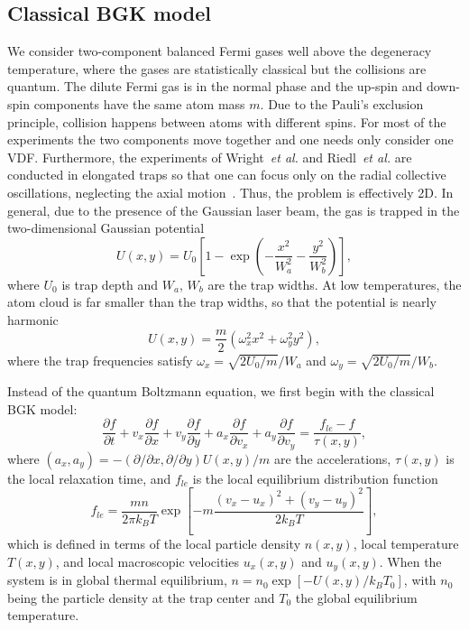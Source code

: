 \subsection{Classical BGK model}

We consider two-component balanced Fermi gases well above the degeneracy temperature, where the gases are statistically classical but the collisions are quantum. The dilute Fermi gas is in the normal phase and the up-spin and down-spin components have the same atom mass $m$.  Due to the Pauli's exclusion principle, collision happens between atoms with different spins. For most of the experiments the two components move together and one needs only consider one VDF. Furthermore, the experiments of Wright~\textit{et al.} and Riedl~\textit{et al.} are conducted in elongated traps so that one can focus only on the radial collective oscillations, neglecting the axial motion~\cite{Wright2007,Riedl2008,Altmeyer2007}. Thus, the problem is effectively 2D. In general, due to the presence of the Gaussian laser beam, the gas is trapped in the two-dimensional Gaussian potential
\begin{equation}\label{gaussian}
U(x,y)=U_0\left[1-\exp\left(-\frac{x^2}{W_a^2}-\frac{y^2}{W_b^2}\right)\right],
\end{equation}
where $U_0$ is trap depth and $W_a$, $W_b$ are the trap widths.
At low temperatures, the atom cloud is far smaller than the trap widths, so that the potential is nearly harmonic
\begin{equation}\label{harmonic}
U(x,y)=\frac{m}{2}(\omega_x^2x^2+\omega_y^2y^2),
\end{equation}
where the trap frequencies satisfy $\omega_x=\sqrt{2U_0/m}/W_a$ and
$\omega_y=\sqrt{2U_0/m}/W_b$.


Instead of the quantum Boltzmann equation, we first begin with the classical BGK model:
\begin{equation}\label{bgk}
\frac{\partial f}{\partial t}+v_x\frac{\partial f}{\partial x}+v_y\frac{\partial f}{\partial y}+a_x\frac{\partial f}     {\partial v_x}+a_y\frac{\partial f}{\partial v_y}=\frac{f_{le}-f}{\tau(x,y)},
\end{equation}
where $(a_x,a_y)=-(\partial/\partial x,\partial/\partial y)U(x,y)/m$ are the accelerations, $\tau(x,y)$ is the local relaxation time, and $f_{le}$ is the local equilibrium distribution function 
\begin{equation}\label{gle}
f_{le}=\frac{mn}{{2\pi     k_BT}}\exp\left[-m\frac{(v_x-u_x)^2+(v_y-u_y)^2}{2k_BT}\right],
\end{equation}
which is defined in terms of the local particle density $n(x,y)$, local temperature $T(x,y)$, and local macroscopic velocities $u_x(x,y)$ and $u_y(x,y)$. When the system is in global thermal equilibrium, $n=n_0\exp[-U(x,y)/k_BT_0]$, with $n_0$ being the particle density at the trap center and $T_0$ the global equilibrium temperature.

